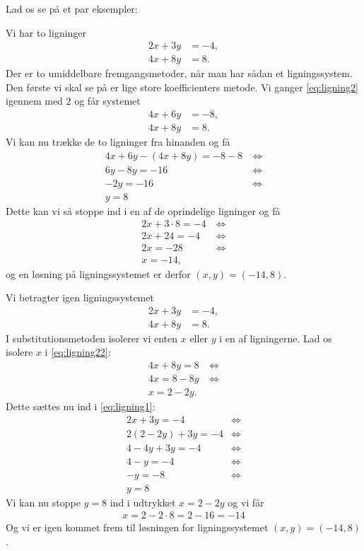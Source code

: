 Lad os se på et par eksempler:
\begin{exa}
	Vi har to ligninger
	\begin{align}
		2x+3y &= -4, \nonumber \\
		4x+8y &= 8.\label{eq:ligning2}
	\end{align}
	Der er to umiddelbare fremgangsmetoder, når man har sådan et ligningssystem. Den første
	vi skal se på er lige store koefficienters metode. Vi ganger \eqref{eq:ligning2} igennem
	med $2$ og får systemet
	\begin{align*}
		4x+6y &= -8,\\
		4x+8y &= 8.
	\end{align*}	
	Vi kan nu trække de to ligninger fra hinanden og få
	\begin{align*}
		4x+6y-(4x+8y) = -8-8 \ &\Leftrightarrow\\
		6y-8y=-16 &\Leftrightarrow\\
		-2y=-16 &\Leftrightarrow \\
		y = 8
	\end{align*}
	Dette kan vi så stoppe ind i en af de oprindelige ligninger og få 
	\begin{align*}
		2x+3\cdot 8 =-4 \ &\Leftrightarrow\\
		2x + 24 = -4 &\Leftrightarrow\\
		2x = -28 &\Leftrightarrow\\
		x = -14,
	\end{align*}
	og en løsning på ligningssystemet er derfor $(x,y) = (-14,8)$.
	\end{exa}
\begin{exa}[Substitutionsmetoden]
Vi betragter igen ligningssystemet
\begin{align}
2x+3y &= -4\label{eq:ligning1},\\
4x+8y &= 8\label{eq:ligning22}.
\end{align}
I substitutionsmetoden isolerer vi enten $x$ eller $y$ i en af ligningerne. Lad os isolere $x$ i \eqref{eq:ligning22}:
\begin{align*}
4x + 8y = 8 \ &\Leftrightarrow\\
4x = 8-8y &\Leftrightarrow\\
x = 2 - 2y.
\end{align*}
Dette sættes nu ind i \eqref{eq:ligning1}:
\begin{align*}
2x + 3y = -4 &\Leftrightarrow\\
2(2-2y) + 3y = -4 &\Leftrightarrow\\
4-4y +3y = -4 &\Leftrightarrow\\
4-y = -4 &\Leftrightarrow\\
-y = -8 &\Leftrightarrow\\
y = 8
\end{align*}
Vi kan nu stoppe $y=8$ ind i udtrykket $x = 2-2y$ og vi får
\begin{align*}
x = 2-2\cdot 8 = 2-16 = -14
\end{align*}
Og vi er igen kommet frem til løsningen for ligningssystemet $(x,y) = (-14,8)$.
\end{exa}

